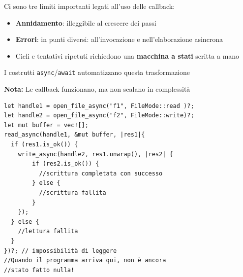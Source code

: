 \begin{flushleft}
  \begin{minipage}{0.35\linewidth}
    \raggedright




    Ci sono tre limiti importanti legati all'uso delle callback:
    \begin{itemize}
      \item \textbf{Annidamento}: illeggibile al crescere dei passi
      \item \textbf{Errori}: in punti diversi: all'invocazione e nell'elaborazione asincrona
      \item Cicli e tentativi ripetuti richiedono una \textbf{macchina a stati} scritta a mano
    \end{itemize}

    I costrutti \verb|async|/\verb|await| automatizzano questa trasformazione


    \begin{tcolorbox}
      \textbf{Nota:} Le callback funzionano, ma non scalano in complessità
    \end{tcolorbox}
  \end{minipage}%
  \hfill
  \begin{minipage}{0.6\linewidth}
    \begin{verbatim}
let handle1 = open_file_async("f1", FileMode::read )?;
let handle2 = open_file_async("f2", FileMode::write)?;
let mut buffer = vec![];
read_async(handle1, &mut buffer, |res1|{
  if (res1.is_ok()) {
    write_async(handle2, res1.unwrap(), |res2| {
        if (res2.is_ok()) {
          //scrittura completata con successo
        } else {
          //scrittura fallita
        }
    });
  } else {
    //lettura fallita
  }
})?; // impossibilità di leggere
//Quando il programma arriva qui, non è ancora
//stato fatto nulla!
\end{verbatim}
  \end{minipage}
\end{flushleft}

